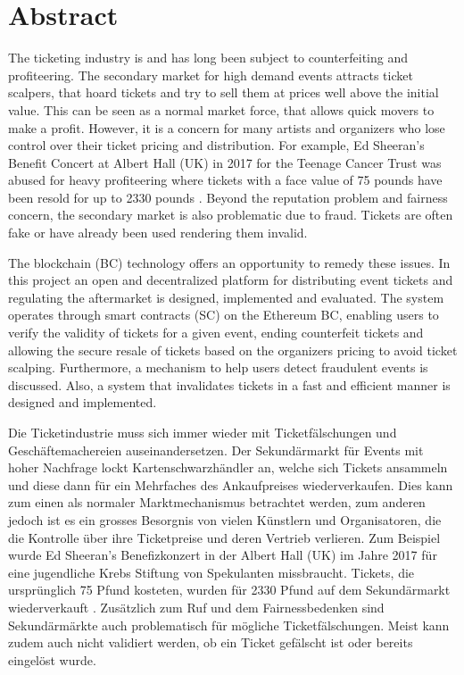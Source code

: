 \chapter*{Abstract}


The ticketing industry is and has long been subject to counterfeiting and profiteering. The secondary market for high demand events attracts ticket scalpers, that hoard tickets and try to sell them at prices well above the initial value. This can be seen as a normal market force, that allows quick movers to make a profit. However, it is a concern for many artists and organizers who lose control over their ticket pricing and distribution. For example, Ed Sheeran's Benefit Concert at Albert Hall (UK) in 2017 for the Teenage Cancer Trust was abused for heavy profiteering where tickets with a face value of 75 pounds have been resold for up to 2330 pounds \cite{ed-sheeran-concert-ticket-prices}. Beyond the reputation problem and fairness concern, the secondary market is also problematic due to fraud. Tickets are often fake or have already been used rendering them invalid. 

The blockchain (BC) technology offers an opportunity to remedy these issues. In this project an open and decentralized platform for distributing event tickets and regulating the aftermarket is designed, implemented and evaluated. The system operates through smart contracts (SC) on the Ethereum BC, enabling users to verify the validity of tickets for a given event, ending counterfeit tickets and allowing the secure resale of tickets based on the organizers pricing to avoid ticket scalping. Furthermore, a mechanism to help users detect fraudulent events is discussed. Also, a system that invalidates tickets in a fast and efficient manner is designed and implemented.

\newpage
{}

Die Ticketindustrie muss sich immer wieder mit Ticketf{\"a}lschungen und Gesch{\"a}ftemachereien auseinandersetzen. Der Sekund{\"a}rmarkt f{\"u}r Events mit hoher Nachfrage lockt Kartenschwarzh{\"a}ndler an, welche sich Tickets ansammeln und diese dann f{\"u}r ein Mehrfaches des Ankaufpreises wiederverkaufen. Dies kann zum einen als normaler Marktmechanismus betrachtet werden, zum anderen jedoch ist es ein grosses Besorgnis von vielen K{\"u}nstlern und Organisatoren, die die Kontrolle {\"u}ber ihre Ticketpreise und deren Vertrieb verlieren. Zum Beispiel wurde Ed Sheeran's Benefizkonzert in der Albert Hall (UK) im Jahre 2017 f{\"u}r eine jugendliche Krebs Stiftung von Spekulanten missbraucht. Tickets, die urspr{\"u}nglich 75 Pfund kosteten, wurden f{\"u}r 2330 Pfund auf dem Sekund{\"a}rmarkt wiederverkauft \cite{ed-sheeran-concert-ticket-prices}. Zus{\"a}tzlich zum Ruf und dem Fairnessbedenken sind Sekund{\"a}rm{\"a}rkte auch problematisch f{\"u}r m{\"o}gliche Ticketf{\"a}lschungen. Meist kann zudem auch nicht validiert werden, ob ein Ticket gef{\"a}lscht ist oder bereits eingel{\"o}st wurde.

